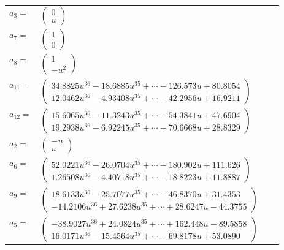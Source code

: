 \documentclass[1p]{elsarticle_modified}
\theoremstyle{definition}
\begin{document}
\begin{tabular}{m{7pt} m{180pt} m{7pt} m{180pt} }
\flushright $a_{3}=$&$\begin{pmatrix}0\\u\end{pmatrix}$ \\
\flushright $a_{7}=$&$\begin{pmatrix}1\\0\end{pmatrix}$ \\
\flushright $a_{8}=$&$\begin{pmatrix}1\\- u^2\end{pmatrix}$ \\
\flushright $a_{11}=$&$\begin{pmatrix}34.8825 u^{36}-18.6885 u^{35}+\cdots-126.573 u+80.8054\\12.0462 u^{36}-4.93408 u^{35}+\cdots-42.2956 u+16.9211\end{pmatrix}$ \\
\flushright $a_{12}=$&$\begin{pmatrix}15.6065 u^{36}-11.3243 u^{35}+\cdots-54.3841 u+47.6904\\19.2938 u^{36}-6.92245 u^{35}+\cdots-70.6668 u+28.8329\end{pmatrix}$ \\
\flushright $a_{2}=$&$\begin{pmatrix}- u\\u\end{pmatrix}$ \\
\flushright $a_{6}=$&$\begin{pmatrix}52.0221 u^{36}-26.0704 u^{35}+\cdots-180.902 u+111.626\\1.26508 u^{36}-4.40718 u^{35}+\cdots-18.8223 u+11.8887\end{pmatrix}$ \\
\flushright $a_{9}=$&$\begin{pmatrix}18.6133 u^{36}-25.7077 u^{35}+\cdots-46.8370 u+31.4353\\-14.2106 u^{36}+27.6238 u^{35}+\cdots+28.6247 u-44.3755\end{pmatrix}$ \\
\flushright $a_{5}=$&$\begin{pmatrix}-38.9027 u^{36}+24.0824 u^{35}+\cdots+162.448 u-89.5858\\16.0171 u^{36}-15.4564 u^{35}+\cdots-69.8178 u+53.0890\end{pmatrix}$ \\

\end{tabular}
\end{document}
